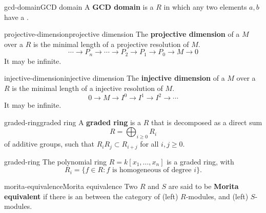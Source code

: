 \begin{topic}{gcd-domain}{GCD domain}
    A \textbf{GCD domain} is a  $R$ in which any two elements $a, b$ have a .
\end{topic}

\begin{topic}{projective-dimension}{projective dimension}
    The \textbf{projective dimension} of a  $M$ over a  $R$ is the minimal length of a projective resolution of $M$.
    \[ \cdots \to P_n \to \cdots \to P_2 \to P_1 \to P_0 \to M \to 0 \]
    It may be infinite.
\end{topic}

\begin{topic}{injective-dimension}{injective dimension}
    The \textbf{injective dimension} of a  $M$ over a  $R$ is the minimal length of a injective resolution of $M$.
    \[ 0 \to M \to I^0 \to I^1 \to I^2 \to \cdots \]
    It may be infinite.
\end{topic}


\begin{topic}{graded-ring}{graded ring}
    A \textbf{graded ring} is a  $R$ that is decomposed as a direct sum
    \[ R = \bigoplus_{i \ge 0} R_i \]
    of additive groups, such that $R_i R_j \subset R_{i + j}$ for all $i, j \ge 0$.
\end{topic}

\begin{example}{graded-ring}
    The polynomial ring $R = k[x_1, \ldots, x_n]$ is a graded ring, with
    \[ R_i = \{ f \in R : f \text{ is homogeneous of degree $i$} \} . \]
\end{example}

\begin{topic}{morita-equivalence}{Morita equivalence}
    Two  $R$ and $S$ are said to be \textbf{Morita equivalent} if there is an  between the category of (left) $R$-modules, and (left) $S$-modules.
\end{topic}

